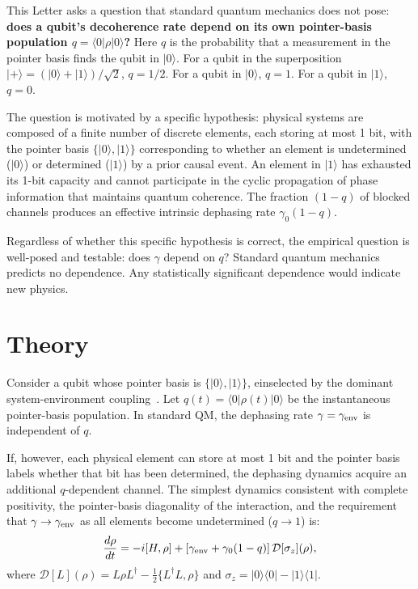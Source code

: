 \documentclass[aps,prl,twocolumn,superscriptaddress,hyperref]{revtex4-2}
\begin{document}
This Letter asks a question that standard quantum mechanics does not pose: \textbf{does a qubit's decoherence rate depend on its own pointer-basis population $q = \langle 0|\rho|0\rangle$?} Here $q$ is the probability that a measurement in the pointer basis finds the qubit in $|0\rangle$. For a qubit in the superposition $|+\rangle = (|0\rangle+|1\rangle)/\sqrt{2}$, $q=1/2$. For a qubit in $|0\rangle$, $q=1$. For a qubit in $|1\rangle$, $q=0$.

The question is motivated by a specific hypothesis: physical systems are composed of a finite number of discrete elements, each storing at most 1 bit, with the pointer basis $\{|0\rangle,|1\rangle\}$ corresponding to whether an element is undetermined ($|0\rangle$) or determined ($|1\rangle$) by a prior causal event. An element in $|1\rangle$ has exhausted its 1-bit capacity and cannot participate in the cyclic propagation of phase information that maintains quantum coherence. The fraction $(1-q)$ of blocked channels produces an effective intrinsic dephasing rate $\gamma_0(1-q)$.

Regardless of whether this specific hypothesis is correct, the empirical question is well-posed and testable: does $\gamma$ depend on $q$? Standard quantum mechanics predicts no dependence. Any statistically significant dependence would indicate new physics.

\section{Theory}

Consider a qubit whose pointer basis is $\{|0\rangle,|1\rangle\}$, einselected by the dominant system-environment coupling~\cite{Zurek:2003}. Let $q(t) = \langle 0|\rho(t)|0\rangle$ be the instantaneous pointer-basis population. In standard QM, the dephasing rate $\gamma = \gamma_{\rm env}$ is independent of $q$.

If, however, each physical element can store at most 1 bit and the pointer basis labels whether that bit has been determined, the dephasing dynamics acquire an additional $q$-dependent channel. The simplest dynamics consistent with complete positivity, the pointer-basis diagonality of the interaction, and the requirement that $\gamma \to \gamma_{\rm env}$ as all elements become undetermined ($q \to 1$) is:
\begin{equation}
\frac{d\rho}{dt} = -i[H,\rho] + [\gamma_{\rm env} + \gamma_0(1-q)]\,\mathcal{D}[\sigma_z](\rho),
\label{eq:lindblad}
\end{equation}
where $\mathcal{D}[L](\rho) = L\rho L^\dagger - \frac{1}{2}\{L^\dagger L, \rho\}$ and $\sigma_z = |0\rangle\langle 0| - |1\rangle\langle 1|$.
\end{document}
